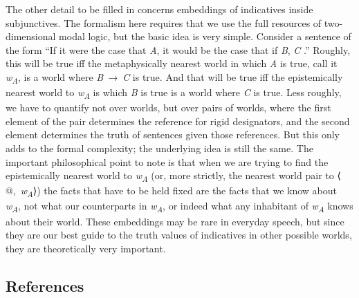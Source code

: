 \documentclass[
  10pt,
  letterpaper,
  DIV=11,
  numbers=noendperiod,
  twoside]{scrartcl}
\begin{document}
The other detail to be filled in concerns embeddings of indicatives
inside subjunctives. The formalism here requires that we use the full
resources of two- dimensional modal logic, but the basic idea is very
simple. Consider a sentence of the form ``If it were the case that
\emph{A}, it would be the case that if \emph{B}, \emph{C} .'' Roughly,
this will be true iff the metaphysically nearest world in which \emph{A}
is true, call it \emph{w\textsubscript{A}}, is a world where
\emph{B}~→~\emph{C} is true. And that will be true iff the epistemically
nearest world to \emph{w\textsubscript{A}} is which \emph{B} is true is
a world where \emph{C} is true. Less roughly, we have to quantify not
over worlds, but over pairs of worlds, where the first element of the
pair determines the reference for rigid designators, and the second
element determines the truth of sentences given those references. But
this only adds to the formal complexity; the underlying idea is still
the same. The important philosophical point to note is that when we are
trying to find the epistemically nearest world to
\emph{w\textsubscript{A}} (or, more strictly, the nearest world pair to
⟨ @,~\emph{w\textsubscript{A}}⟩) the facts that have to be held fixed
are the facts that we know about \emph{w\textsubscript{A}}, not what our
counterparts in \emph{w\textsubscript{A}}, or indeed what any inhabitant
of \emph{w\textsubscript{A}} knows about their world. These embeddings
may be rare in everyday speech, but since they are our best guide to the
truth values of indicatives in other possible worlds, they are
theoretically very important.

\subsection*{References}\label{references}
\end{document}
